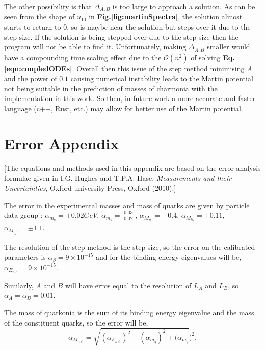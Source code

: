 \documentclass[10pt,twocolumn]{revtex4}    %
\begin{document}
The other possibility is that $\Delta_{A,B}$ is too large to approach a solution. As can be seen from the shape of $u_{10}$ in \textbf{Fig.\ref{fig:martinSpectra}}, the solution almost starts to return to $0$, so is maybe near the solution but steps over it due to the step size. If the solution is being stepped over due to the step size then the program will not be able to find it. Unfortunately, making $\Delta_{A,B}$ smaller would have a compounding time scaling effect due to the $\mathcal{O}(n^2)$ of solving \textbf{Eq.\ref{eqn:coupledODEs}}. Overall then this issue of the step method minimising $A$ and the power of $0.1$ causing numerical instability leads to the Martin potential not being suitable in the prediction of masses of charmonia with the implementation in this work.
So then, in future work a more accurate and faster language (c++, Rust, etc.) may allow for better use of the Martin potential.



\printbibliography


\newpage

\section*{Error Appendix}
[The equations and methods used in this appendix are based on the error analysis formulae given in I.G. Hughes and T.P.A. Hase, \textit{Measurements and their Uncertainties}, Oxford university Press, Oxford (2010).]\newline

The error in the experimental masses and mass of quarks are given by particle data group \textbf{\cite{pdg}}: $\alpha_{m_c} = \pm0.02GeV$, $\alpha_{m_b} = ^{+0.03}_{-0.02}$, $\alpha_{M_{\eta_c}} = \pm0.4$, $\alpha_{M_{h_c}} = \pm0.11$, $\alpha_{M_{\eta_c'}} = \pm1.1$.

The resolution of the step method is the step size, so the error on the calibrated parameters is $\alpha_\beta = 9\times10^{-15}$ and for the binding energy eigenvalues will be, $\alpha_{E_{n\ell}} = 9\times10^{-15}$.

Similarly, $A$ and $B$ will have erros equal to the resolution of $L_A$ and $L_B$, so $\alpha_A = \alpha_B = 0.01$.

The mass of quarkonia is the sum of its binding energy eigenvalue and the mass of the constituent quarks, so the error will be,
\begin{equation*}
    \alpha_{M_{n\ell}} = \sqrt{(\alpha_{E_{n\ell}})^2 + (\alpha_{m_q})^2 + (\alpha_{m_\overline{q}}})^2.
\end{equation*}
\end{document}
